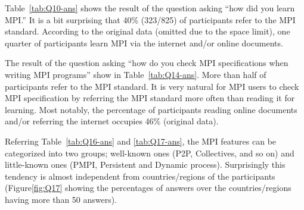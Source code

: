 \documentclass[sigconf,nonacm]{acmart}
\begin{document}
Table~\ref{tab:Q10-ans} shows the result of the question asking ``how
did you learn MPI.'' It is a bit surprising that 40\% (323/825) of
participants refer to the MPI standard. According to the original
data (omitted due to the space limit), one quarter of participants
learn MPI via the internet and/or online documents.

The result of the question asking ``how do you check MPI
specifications when writing MPI programs'' show in
Table~\ref{tab:Q14-ans}. More than half of participants refer to the
MPI standard. It is very natural for MPI users to check MPI
specification by referring the MPI standard more often than reading it
for learning. Most notably, the percentage of participants reading
online documents and/or referring the internet occupies 46\% (original
data).

Referring Table~\ref{tab:Q16-ans} and \ref{tab:Q17-ans}, the MPI
features can be categorized into two groups; well-known ones (P2P,
Collectives, and so on) and little-known ones (PMPI, Persistent and
Dynamic process). Surprisingly this tendency is almost independent
from countries/regions of the participants
(Figure\ref{fig:Q17} showing the percentages of answers over the
countries/regions having more than 50 answers).

\end{document}
